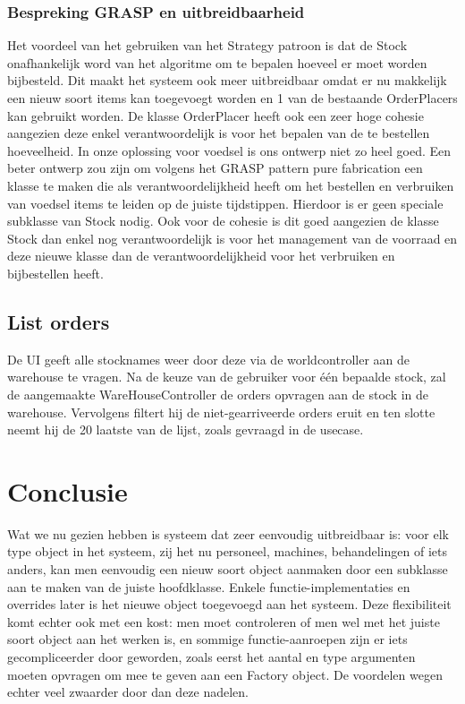 \documentclass[a4paper]{article}
\begin{document}
\subsubsection{Bespreking GRASP en uitbreidbaarheid}
Het voordeel van het gebruiken van het Strategy patroon is dat de Stock onafhankelijk word van het algoritme om te bepalen hoeveel er moet worden bijbesteld. Dit maakt het systeem ook meer uitbreidbaar omdat er nu makkelijk een nieuw soort items kan toegevoegt worden en 1 van de bestaande OrderPlacers kan gebruikt worden. De klasse OrderPlacer heeft ook een zeer hoge cohesie aangezien deze enkel verantwoordelijk is voor het bepalen van de te bestellen hoeveelheid. In onze oplossing voor voedsel is ons ontwerp niet zo heel goed. Een beter ontwerp zou zijn om volgens het GRASP pattern pure fabrication een klasse te maken die als verantwoordelijkheid heeft om het bestellen en verbruiken van voedsel items te leiden op de juiste tijdstippen. Hierdoor is er geen speciale subklasse van Stock nodig. Ook voor de cohesie is dit goed aangezien de klasse Stock dan enkel nog verantwoordelijk is voor het management van de voorraad en deze nieuwe klasse dan de verantwoordelijkheid voor het verbruiken en bijbestellen heeft.

\subsection{List orders}
De UI geeft alle stocknames weer door deze via de worldcontroller aan de warehouse te vragen. Na de keuze van de gebruiker voor \'e\'en bepaalde stock, zal de aangemaakte WareHouseController de orders opvragen aan de stock in de warehouse. Vervolgens filtert hij de niet-gearriveerde orders eruit en ten slotte neemt hij de 20 laatste van de lijst, zoals gevraagd in de usecase.



\section{Conclusie}
Wat we nu gezien hebben is systeem dat zeer eenvoudig uitbreidbaar is: voor elk type object in het systeem, zij het nu personeel, machines, behandelingen of iets anders, kan men eenvoudig een nieuw soort object aanmaken door een subklasse aan te maken van de juiste hoofdklasse. Enkele functie-implementaties en overrides later is het nieuwe object toegevoegd aan het systeem.
Deze flexibiliteit komt echter ook met een kost: men moet controleren of men wel met het juiste soort object aan het werken is, en sommige functie-aanroepen zijn er iets gecompliceerder door geworden, zoals eerst het aantal en type argumenten moeten opvragen om mee te geven aan een Factory object. De voordelen wegen echter veel zwaarder door dan deze nadelen.
\end{document}

